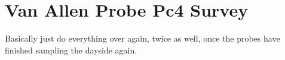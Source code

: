 \section{Van Allen Probe Pc4 Survey}



Basically just do everything over again, twice as well, once the probes have finished sampling the dayside again. 







